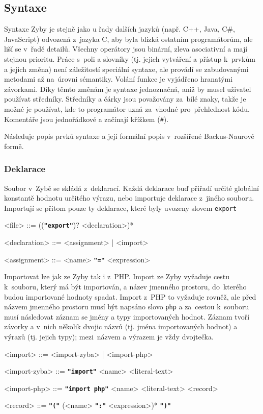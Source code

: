 \documentclass[a4paper,12pt]{article}
\def\quote #1{"#1"}
\def\emphasis #1{\textbf{\texttt{\quote{#1}}}}
\begin{document}
\subsection{Syntaxe}
Syntaxe Zyby je stejně jako u řady dalších jazyků (např. C++, Java, C\#, JavaScript) odvozená z~jazyka C, aby byla blízká ostatním programátorům, ale liší se v~řadě detailů. Všechny operátory jsou binární, zleva asociativní a mají stejnou prioritu. Práce s~poli a slovníky (tj. jejich vytváření a přístup k~prvkům a jejich změna) není záležitostí speciální syntaxe, ale provádí se zabudovanými metodami až na~úrovni sémantiky. Volání funkce je vyjádřeno hranatými závorkami. Díky těmto změnám je syntaxe jednoznačná, aniž by musel uživatel používat středníky. Středníky a čárky jsou považovány za~bílé znaky, takže je možné je používat, kde to programátor uzná za~vhodné pro~přehlednost kódu. Komentáře jsou jednořádkové a začínají křížkem (\texttt{\#}).

Následuje popis prvků syntaxe a její formální popis v~rozšířené Backus-Naurově formě.

\subsubsection{Deklarace}
Soubor v~Zybě se skládá z~deklarací. Každá deklarace buď přiřadí určité globální konstantě hodnotu určitého výrazu, nebo importuje deklarace z~jiného souboru. Importují se přitom pouze ty deklarace, které byly uvozeny slovem \texttt{export}
\begin{grammar}
<file> ::= ((\emphasis{export})? <declaration>)*

<declaration> ::= <assignment> | <import>

<assignment> ::= <name> \emphasis{=} <expression>
\end{grammar}

Importovat lze jak ze Zyby tak i z~PHP. Import ze Zyby vyžaduje cestu k~souboru, který má být importován, a název jmenného prostoru, do~kterého budou importované hodnoty spadat. Import z~PHP to vyžaduje rovněž, ale před názvem jmenného prostoru musí být napsáno slovo \texttt{php} a za~cestou k~souboru musí následovat záznam se jmény a typy importovaných hodnot. Záznam tvoří závorky a v~nich několik dvojic názvů (tj. jména importovaných hodnot) a výrazů (tj. jejich typy); mezi~názvem a výrazem je vždy dvojtečka.
\begin{grammar}
<import> ::= <import-zyba> | <import-php>

<import-zyba> ::= \emphasis{import} <name> <literal-text>

<import-php> ::= \emphasis{import php} <name> <literal-text> <record>

<record> ::= \emphasis{(} (<name> \emphasis{:} <expression>)* \emphasis{)}
\end{grammar}
\end{document}
